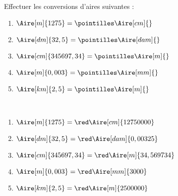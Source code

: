 \begin{exercice*} %
   Effectuer les conversions d'aires suivantes :
   \begin{enumerate}
      \item $\Aire[m]{1275} =\pointilles \Aire[cm]{}$
      \item $\Aire[dm]{32,5} =\pointilles\Aire[dam]{}$
      \item $\Aire[cm]{345697,34} =\pointilles\Aire[m]{}$
      \item $\Aire[m]{0,003} =\pointilles\Aire[mm]{}$
      \item $\Aire[km]{2,5} =\pointilles \Aire[m]{}$
   \end{enumerate}
\end{exercice*}

\begin{corrige}
\ \\ [-5mm]
   \begin{enumerate}
      \item $\Aire[m]{1275} =\red\Aire[cm]{12750000}$
      \item $\Aire[dm]{32,5} =\red\Aire[dam]{0,00325}$
      \item $\Aire[cm]{345697,34} =\red\Aire[m]{34,569734}$
      \item $\Aire[m]{0,003} =\red\Aire[mm]{3000}$
      \item $\Aire[km]{2,5} =\red\Aire[m]{2500000}$
   \end{enumerate}
\end{corrige}

